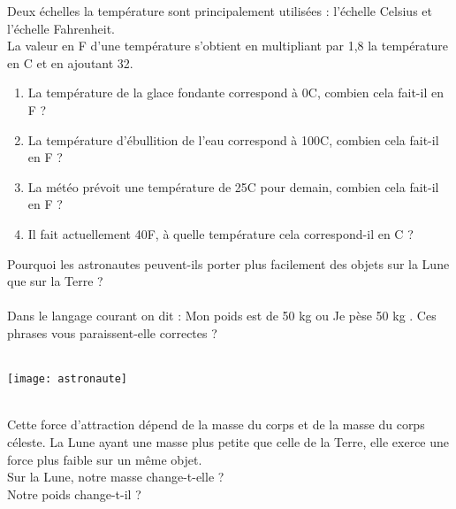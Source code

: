 \begin{colonne*exercice}
\medskip

\begin{exercice} %
   Deux échelles la température sont principalement utilisées : l'échelle Celsius et l'échelle Fahrenheit. \\
   La valeur en \degres F d'une température s'obtient en multipliant par 1,8 la température en \degre C et en ajoutant 32.
   \begin{enumerate}
      \item La température de la glace fondante correspond à 0\degres C, combien cela fait-il en \degres F ?
      \item La température d'ébullition de l'eau correspond à 100\degres C, combien cela fait-il en \degres F ?
      \item La météo prévoit une température de 25\degres C pour demain, combien cela fait-il en \degres F ?
      \item Il fait actuellement 40\degres F, à quelle température cela correspond-il en \degres C ?
   \end{enumerate}
\end{exercice}

\end{colonne*exercice}


\Recreation

      \begin{minipage}{11.5cm}
         Pourquoi les astronautes peuvent-ils porter plus facilement des objets sur la Lune que sur la Terre ? \\ [2mm]
         \pf \\ [2mm]
         Dans le langage courant on dit : \og Mon poids est de 50 kg \fg{} ou \og Je pèse 50 kg \fg{}. Ces phrases vous paraissent-elle correctes ? \\ [2mm]
         \pf \\ [2mm]
      \end{minipage}
      \qquad
      \begin{minipage}{4.5cm}
         \texttt{[image: astronaute]}
      \end{minipage}
   
       \\ [1mm]
      Cette force d’attraction dépend de la masse du corps et de la masse du corps céleste. La Lune ayant une masse plus petite que celle de la Terre, elle exerce une force plus faible sur un même objet. \\ [2mm]
      Sur la Lune, notre masse change-t-elle ? \pf \\ [2mm]
      Notre poids change-t-il ? \pf \\
   
